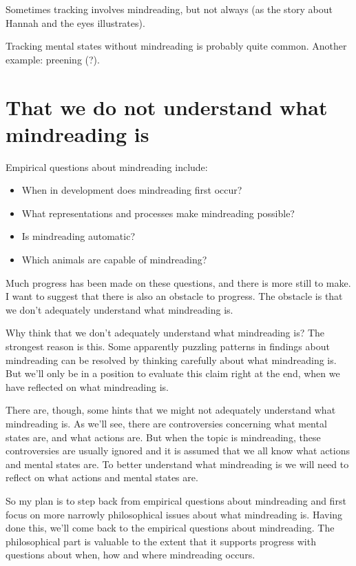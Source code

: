 \documentclass[12pt,\papersize]{extarticle}
\begin{document}
Sometimes tracking involves mindreading, but not always (as the story about Hannah and the eyes illustrates).

Tracking mental states without mindreading is probably quite common.  Another example: preening (?).


\section{That we do not understand what mindreading is}
Empirical questions about mindreading include:
\begin{itemize}
\item When in development does mindreading first occur?
\item What representations and processes make mindreading possible?
\item Is mindreading automatic?
\item Which animals are capable of mindreading?
\end{itemize}
%
Much progress has been made on these questions, and there is more still to make. 
I want to suggest that there is also an obstacle to progress.
The obstacle is that we don't adequately understand what mindreading is. 

Why think that we don't adequately understand what mindreading is? 
The strongest reason is this.
Some apparently puzzling patterns in findings about mindreading can be resolved by thinking carefully about what mindreading is. 
But we'll only be in a position to evaluate this claim right at the end, when we have reflected on what mindreading is.

There are, though, some hints that we might not adequately understand what mindreading is.
As we'll see, there are controversies concerning what mental states are, and what actions are.  
But when the topic is mindreading, these controversies are usually ignored and it is assumed that we all know what actions and mental states are. 
To better understand what mindreading is we will need to reflect on what actions and mental states are.

So my plan is to step back from empirical questions about mindreading and first focus on more narrowly philosophical issues about what mindreading is.
Having done this, we'll come back to the empirical questions about mindreading.  
The philosophical part is valuable to the extent that it supports progress with questions about when, how and where mindreading occurs.
\end{document}
